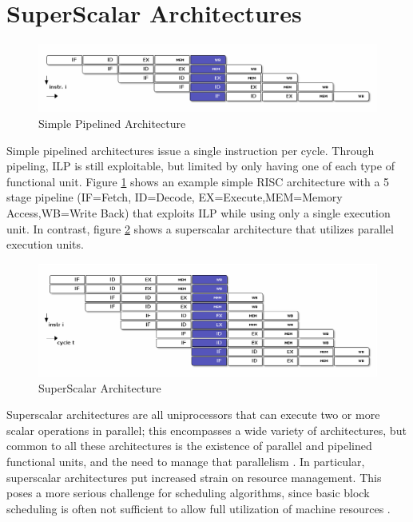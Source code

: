 \documentclass[12pt]{report}
\begin{document}
\section{SuperScalar Architectures}
\label{sec:orge794004}

\begin{figure}[htbp]
\centering
\includegraphics[width=1.0\textwidth]{figures/RISCPipeline.png}
\caption{\label{fig:PipelinedArchitecture}Simple Pipelined Architecture}
\end{figure}


Simple pipelined architectures issue a single instruction per cycle.
Through pipeling, ILP is still exploitable, but limited by only having one of
each type of functional unit. Figure \ref{fig:PipelinedArchitecture} shows an
example simple RISC architecture with a 5 stage pipeline (IF=Fetch,
ID=Decode, EX=Execute,MEM=Memory Access,WB=Write Back) that exploits ILP while using only a single
execution unit. In contrast, figure \ref{fig:SuperScalarArchitecture} shows a
superscalar architecture that utilizes parallel execution units.  

\begin{figure}[htbp]
\centering
\includegraphics[width=1.0\textwidth]{figures/SuperScalarPipeline.png}
\caption{\label{fig:SuperScalarArchitecture}SuperScalar Architecture}
\end{figure}


Superscalar architectures are all uniprocessors that can execute two or more
scalar operations in parallel; this encompasses a wide variety of
architectures, but common to all these architectures is the existence of
parallel and pipelined functional units, and the need to manage that
parallelism \parencite{zyuban2001inherently}. In particular, superscalar
architectures put increased strain on resource management. This poses a more
serious challenge for scheduling algorithms, since basic block scheduling is
often not sufficient to allow full utilization of machine
resources \parencite{bernstein1991global}. 
\end{document}
